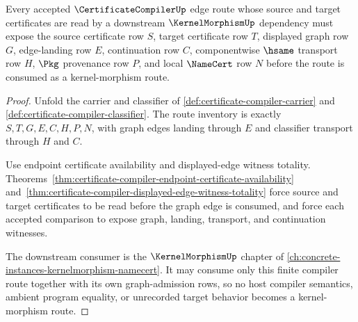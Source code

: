 \begin{theorem}
\label{thm:certificatecompiler-kernel-morphism-route-coverage}
Every accepted $\CertificateCompilerUp$ edge route whose source and target certificates are read by a downstream $\KernelMorphismUp$ dependency must expose the source certificate row $S$, target certificate row $T$, displayed graph row $G$, edge-landing row $E$, continuation row $C$, componentwise $\hsame$ transport row $H$, $\Pkg$ provenance row $P$, and local $\NameCert$ row $N$ before the route is consumed as a kernel-morphism route.
\end{theorem}
\begin{proof}
Unfold the carrier and classifier of \autoref{def:certificate-compiler-carrier} and \autoref{def:certificate-compiler-classifier}. The route inventory is exactly $S,T,G,E,C,H,P,N$, with graph edges landing through $E$ and classifier transport through $H$ and $C$.

Use endpoint certificate availability and displayed-edge witness totality. Theorems~\ref{thm:certificate-compiler-endpoint-certificate-availability} and~\ref{thm:certificate-compiler-displayed-edge-witness-totality} force source and target certificates to be read before the graph edge is consumed, and force each accepted comparison to expose graph, landing, transport, and continuation witnesses.

The downstream consumer is the $\KernelMorphismUp$ chapter of \autoref{ch:concrete-instances-kernelmorphism-namecert}. It may consume only this finite compiler route together with its own graph-admission rows, so no host compiler semantics, ambient program equality, or unrecorded target behavior becomes a kernel-morphism route.
\end{proof}

